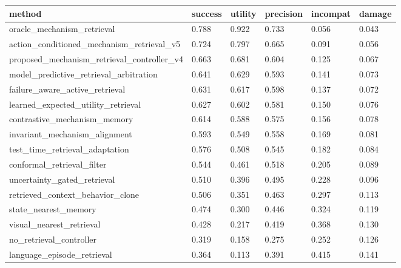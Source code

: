 \begin{tabular}{llllll}
\toprule
method & success & utility & precision & incompat & damage \\
\midrule
oracle\_mechanism\_retrieval & 0.788 & 0.922 & 0.733 & 0.056 & 0.043 \\
action\_conditioned\_mechanism\_retrieval\_v5 & 0.724 & 0.797 & 0.665 & 0.091 & 0.056 \\
proposed\_mechanism\_retrieval\_controller\_v4 & 0.663 & 0.681 & 0.604 & 0.125 & 0.067 \\
model\_predictive\_retrieval\_arbitration & 0.641 & 0.629 & 0.593 & 0.141 & 0.073 \\
failure\_aware\_active\_retrieval & 0.631 & 0.617 & 0.598 & 0.137 & 0.072 \\
learned\_expected\_utility\_retrieval & 0.627 & 0.602 & 0.581 & 0.150 & 0.076 \\
contrastive\_mechanism\_memory & 0.614 & 0.588 & 0.575 & 0.156 & 0.078 \\
invariant\_mechanism\_alignment & 0.593 & 0.549 & 0.558 & 0.169 & 0.081 \\
test\_time\_retrieval\_adaptation & 0.576 & 0.508 & 0.545 & 0.182 & 0.084 \\
conformal\_retrieval\_filter & 0.544 & 0.461 & 0.518 & 0.205 & 0.089 \\
uncertainty\_gated\_retrieval & 0.510 & 0.396 & 0.495 & 0.228 & 0.096 \\
retrieved\_context\_behavior\_clone & 0.506 & 0.351 & 0.463 & 0.297 & 0.113 \\
state\_nearest\_memory & 0.474 & 0.300 & 0.446 & 0.324 & 0.119 \\
visual\_nearest\_retrieval & 0.428 & 0.217 & 0.419 & 0.368 & 0.130 \\
no\_retrieval\_controller & 0.319 & 0.158 & 0.275 & 0.252 & 0.126 \\
language\_episode\_retrieval & 0.364 & 0.113 & 0.391 & 0.415 & 0.141 \\
\bottomrule
\end{tabular}
